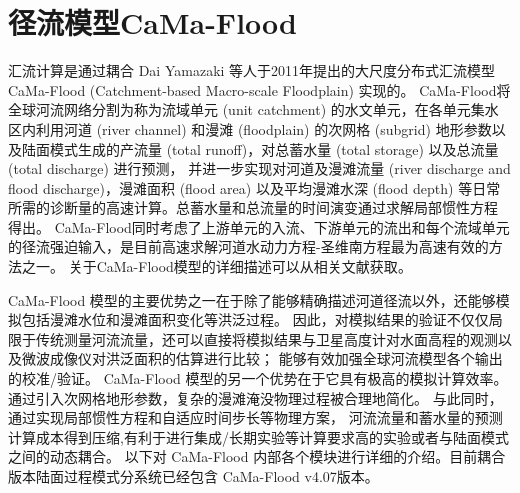 \chapter{径流模型CaMa-Flood}

汇流计算是通过耦合 Dai Yamazaki 等人于2011年提出的大尺度分布式汇流模型 CaMa-Flood (Catchment-based Macro-scale Floodplain) 实现的\citep{yamazaki2011physically}。
CaMa-Flood将全球河流网络分割为称为流域单元 (unit catchment) 的水文单元，在各单元集水区内利用河道 (river channel) 和漫滩 (floodplain) 的次网格 (subgrid) 
地形参数以及陆面模式生成的产流量 (total runoff)，对总蓄水量 (total storage) 以及总流量 (total discharge) 进行预测，
并进一步实现对河道及漫滩流量 (river discharge and flood discharge)，漫滩面积 (flood area) 以及平均漫滩水深 (flood depth) 
等日常所需的诊断量的高速计算。总蓄水量和总流量的时间演变通过求解局部惯性方程 \citep{bates2010} 得出。
CaMa-Flood同时考虑了上游单元的入流、下游单元的流出和每个流域单元的径流强迫输入，是目前高速求解河道水动力方程-圣维南方程最为高速有效的方法之一。
关于CaMa-Flood模型的详细描述可以从相关文献获取\citep{yamazaki2011physically,yamazaki2013improving,yamazaki2014regional,yamazaki2014development}。


CaMa-Flood 模型的主要优势之一在于除了能够精确描述河道径流以外，还能够模拟包括漫滩水位和漫滩面积变化等洪泛过程。
因此，对模拟结果的验证不仅仅局限于传统测量河流流量，还可以直接将模拟结果与卫星高度计对水面高程的观测以及微波成像仪对洪泛面积的估算进行比较；
能够有效加强全球河流模型各个输出的校准/验证\citep{yamazaki2012adjustment,yamazaki2012analysis}。
CaMa-Flood 模型的另一个优势在于它具有极高的模拟计算效率。通过引入次网格地形参数，复杂的漫滩淹没物理过程被合理地简化。
与此同时，通过实现局部惯性方程和自适应时间步长等物理方案\citep{bates2010}，
河流流量和蓄水量的预测计算成本得到压缩,有利于进行集成/长期实验等计算要求高的实验或者与陆面模式之间的动态耦合。
以下对 CaMa-Flood 内部各个模块进行详细的介绍。目前耦合版本陆面过程模式分系统已经包含 CaMa-Flood v4.07版本。



